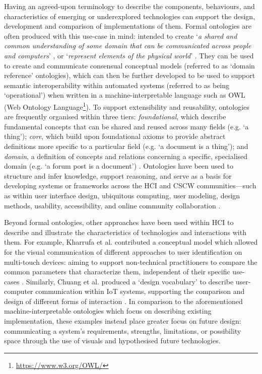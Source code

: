 Having an agreed-upon terminology to describe the components, behaviours, and characteristics of emerging or underexplored technologies can support the design, development and comparison of implementations of them. Formal ontologies are often produced with this use-case in mind: intended to create `\textit{a shared and common understanding of some domain that can be communicated across people and computers}' \cite{struder1998}, or `\textit{represent elements of the physical world}' \cite{Brubaker2011}. They can be used to create and communicate consensual conceptual models (referred to as `domain reference' ontologies), which can then be further developed to be used to support semantic interoperability within automated systems (referred to as being `operational') \cite{guizzardi2007} when written in a machine-interpretable language such as OWL (Web Ontology Language\footnote{\url{https://www.w3.org/OWL/}}). To support extensibility and reusability, ontologies are frequently organised within three tiers: \textit{foundational}, which describe fundamental concepts that can be shared and reused across many fields (e.g. `a thing'); \textit{core}, which build upon foundational axioms to provide abstract definitions more specific to a particular field (e.g. `a document is a thing'); and \textit{domain}, a definition of concepts and relations concerning a specific, specialised domain (e.g. `a forum post is a document') \cite{scherp2011}. Ontologies have been used to structure and infer knowledge, support reasoning, and serve as a basis for developing systems or frameworks across the HCI and CSCW communities---such as within user interface design, ubiquitous computing, user modeling, design methods, usability, accessibility, and online community collaboration \cite{costa2021, Kamran2016}.

Beyond formal ontologies, other approaches have been used within HCI to describe and illustrate the characteristics of technologies and interactions with them. For example, Kharrufa et al. contributed a conceptual model which allowed for the visual communication of different approaches to user identification on multi-touch devices: aiming to support non-technical practitioners to compare the common parameters that characterize them, independent of their specific use-cases \cite{Kharrufa2017}. Similarly, Chuang et al. produced a `design vocabulary' to describe user-computer communication within IoT systems, supporting the comparison and design of different forms of interaction \cite{Chuang2018}. In comparison to the aforementioned machine-interpretable ontologies which focus on describing existing implementation, these examples instead place greater focus on future design: communicating a system's requirements, strengths, limitations, or possibility space through the use of visuals and hypothesised future technologies. 

